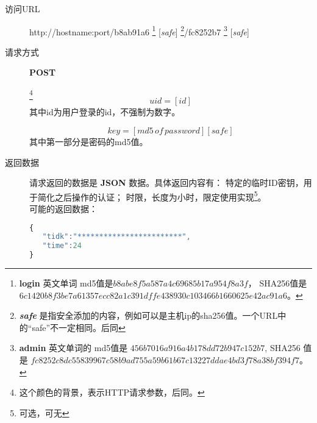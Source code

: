 \documentclass[UTF8]{ctexart}
\begin{document}
    \begin{description}
   
        \item[访问URL] http://hostname:port/b8ab91a6
        \footnote{
            \textbf{login} 英文单词 md5值是$b8abe8f5a587a4c69685b17a954f8a3f$，
            SHA256值是 
            $6c1420b8f3be7a61357ecc82a1c391dffe438930c103466b1660625e42ac91a6$。
        }
        [\textit{safe}]
        \footnote{\textit{\textbf{safe}} 是指安全添加的内容，例如可以是主机ip的sha256值。一个URL中的“safe”不一定相同。后同}/fc8252b7
        \footnote{
            \textbf{admin} 英文单词的
            md5值是 $456b7016a916a4b178dd72b947c152b7 $,
            SHA256 值是
            $fc8252c8dc55839967c58b9ad755a59b61b67c13227ddae4bd3f78a38bf394f7$。
        }
        [\textit{safe}]
        
        \item[请求方式] \textbf{POST}
        
        \label{par:id}
        \footnote{这个颜色的背景，表示HTTP请求参数，后同。}
        $$uid=[id]$$
        其中id为用户登录的id，不强制为数字。
        
        \label{par:key}
         $$key=[md5\, of\, password][safe]$$
         其中第一部分是密码的md5值。
         
        \item[返回数据]请求返回的数据是 \textbf{JSON} 数据。具体返回内容有：
        特定的临时ID密钥，用于简化之后操作的认证；
        时限，长度为小时，限定使用实现\footnote{可选，可无}。
         \\ 可能的返回数据：
        \begin{lstlisting}[language=JavaScript]
{
   "tidk":"************************",
   "time":24
}  
        \end{lstlisting}
        
        
    \end{description}
    
    
    
    
    
    
    
\end{document}
